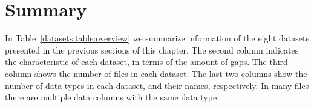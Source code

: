 
\vspace{-15pt}
\section{Summary}
\label{datasets:summary}


In Table~\ref{datasets:table:overview} we summarize information of the eight datasets presented in the previous sections of this chapter. The second column indicates the characteristic of each dataset, in terms of the amount of gaps. The third column shows the number of files in each dataset. The last two columns show the number of data types in each dataset, and their names, respectively. In many files there are multiple data columns with the same data type.




